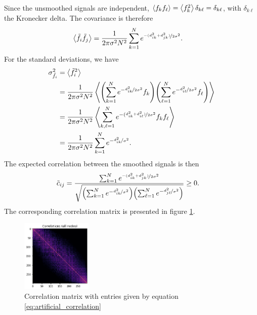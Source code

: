 \documentclass{article}
\begin{document}
\begin{multicols}{2}
\begin{align*}
\end{align*}
Since the unsmoothed signals are independent, $\expval{f_kf_\ell} = \expval{f_k^2}\delta_{k\ell} = \delta_{k\ell}$, with $\delta_{k\ell}$ the Kronecker delta. The covariance is therefore
\begin{align*}
    \expval{\Tilde{f}_i\Tilde{f}_j} &= \frac{1}{2\pi\sigma^2N^2}\sum_{k = 1}^N e^{\nicefrac{-(d_{ik}^2+d_{jk}^2)}{2\sigma^2}}.
\end{align*}
For the standard deviations, we have
\begin{align*}
    \sigma^2_{\Tilde{f}_i} &= \expval{\Tilde{f}_i^2}\\
    &= \frac{1}{2\pi\sigma^2N^2}\expval{\qty(\sum_{k=1}^N e^{-\nicefrac{d_{ik}^2}{2\sigma^2}}f_k)\qty(\sum_{\ell=1}^N e^{-\nicefrac{d_{i\ell}^2}{2\sigma^2}}f_\ell)}\\
    &= \frac{1}{2\pi\sigma^2N^2}\expval{\sum_{k, \ell =1}^N e^{-(\nicefrac{d_{ik}^2 + d_{i\ell}^2)}{2\sigma^2}}f_kf_\ell}\\
    &= \frac{1}{2\pi\sigma^2N^2}\sum_{k=1}^N e^{-\nicefrac{d_{ik}^2}{\sigma^2}}.
\end{align*}
The expected correlation between the smoothed signals is then
\begin{align}
    \Tilde{c}_{ij} &= \frac{\sum_{k = 1}^N e^{\nicefrac{-(d_{ik}^2+d_{jk}^2)}{2\sigma^2}}}{\sqrt{\qty(\sum_{k=1}^N e^{-\nicefrac{d_{ik}^2}{\sigma^2}})\qty(\sum_{\ell=1}^N e^{-\nicefrac{d_{j\ell}^2}{\sigma^2}})}} \geq 0.
    \label{eq:artificial_correlation}
\end{align}
The corresponding correlation matrix is presented in figure \ref{fig:correlation matrix}.

\begin{figure}[H]
    \centering    
    \includegraphics[width=0.3\textwidth]{figures/Theoretical correlations.png}
    \caption{Correlation matrix with entries given by equation \ref{eq:artificial_correlation}}
    \label{fig:correlation matrix}
\end{figure}


\end{multicols}
\end{document}
